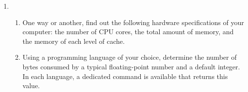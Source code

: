 \documentclass{article}
\begin{document}
\begin{enumerate}
\item
  \begin{enumerate} \setlength{\itemsep}{0pt}
  \item One way or another, find out the following hardware specifications of your computer: the number of CPU cores, the total amount of memory, and the memory of each level of cache.
  \item Using a programming language of your choice, determine the number of bytes consumed by a typical floating-point number and a default integer. In each language, a dedicated command is available that returns this value.
\end{enumerate}
    
\end{enumerate}




\newpage
\end{document}
